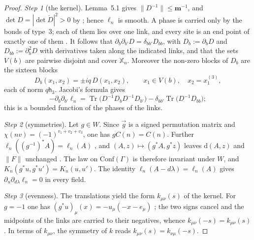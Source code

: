 \documentclass[11pt,letterpaper,reqno]{amsart}
\theoremstyle{definition}
\begin{document}
\begin{proof}
\emph{Step 1} (the kernel).
Lemma~5.1 gives $\|D^{-1}\|\le\mathbf m^{-1}$, and $\det D=|\det\check D|^2>0$ by \cite[Proposition~3.18\,(d)]{QEDII}; hence $\ell_n$ is smooth.
A phase is carried only by the bonds of type~$3$; each of them lies over one link, and every site is an end point of exactly one of them \cite[Proposition~3.6\,(c), (d)]{QEDII}.
It follows that $\partial_b\partial_{b'}D=\delta_{bb'}D_{bb}$, with $D_b:=\partial_bD$ and $D_{bb}:=\partial_b^2D$ with derivatives taken along the indicated links, and that the sets $V(b)$ are pairwise disjoint and cover $\mathbb X_n$.
Moreover the non-zero blocks of $D_b$ are the sixteen blocks
\begin{equation*}
D_b(x_1,x_2)=\pm iq\,D(x_1,x_2),\qquad x_1\in V(b),\quad x_2=x_1^{(3)},
\end{equation*}
each of norm $q\mathsf h_3$.
Jacobi's formula gives
\begin{equation*}
-\partial_b\partial_{b'}\ell_n=\operatorname{Tr}\bigl(D^{-1}D_bD^{-1}D_{b'}\bigr)-\delta_{bb'}\operatorname{Tr}\bigl(D^{-1}D_{bb}\bigr);
\end{equation*}
this is a bounded function of the phases of the links.

\emph{Step 2} (symmetries).
Let $g\in W$.
Since $\vec g$ is a signed permutation matrix and $\chi(nv)=(-1)^{v_1+v_2+v_3}$, one has $gC(n)=C(n)$.
Further $\ell_n((g^{-1})^*A)=\ell_n(A)$ \cite[Proposition~3.16\,(b)]{QEDII}, and $(A,z)\mapsto(g^*A,g^*z)$ leaves $\mathrm d(A,z)$ and $\|F\|$ unchanged \cite[Definition~2.6]{QEDII}.
The law on $\mathrm{Conf}(\Gamma)$ is therefore invariant under $W$, and $K_n(g^*u,g^*u')=K_n(u,u')$.
The identity $\ell_n(A-d\lambda)=\ell_n(A)$ \cite[Proposition~3.16\,(a)]{QEDII} gives $\partial_u\partial_{d\lambda}\ell_n=0$ in every field.

\emph{Step 3} (evenness).
The translations yield the form $k_{\mu\nu}(s)$ of the kernel.
For $g=-1$ one has $(g^*u)_\mu(x)=-u_\mu(-x-e_\mu)$ \cite[Definition~2.1]{QEDII}; the two signs cancel and the midpoints of the links are carried to their negatives, whence $k_{\mu\nu}(-s)=k_{\mu\nu}(s)$.
In terms of $k_{\mu\nu}$, the symmetry of $k$ reads $k_{\mu\nu}(s)=k_{\nu\mu}(-s)$.


\end{proof}
\end{document}
